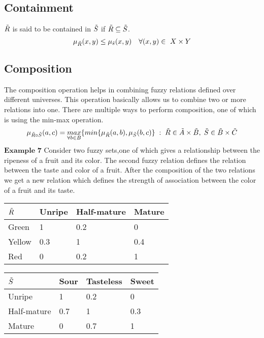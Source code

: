 \documentclass{article}
\begin{document}
\subsection{Containment}
$\Tilde{R}$ is said to be contained in $\Tilde{S}$ if $\Tilde{R} \subseteq\Tilde{S}$.
\[\mu_{\Tilde{R}}(x,y)\leq\mu_{\Tilde{s}}(x,y)\quad\forall (x,y)\in\ X\times Y\]
\subsection{Composition}
The composition operation helps in combining fuzzy relations defined over different universes. This operation basically allows us to combine two or more relations into one. There are multiple ways to perform composition, one of which is using the min-max operation.\newline
\begin{equation}
    \mu_{\Tilde{R}\circ\Tilde{S}}(a,c)=\mathop{max}_{\forall b\in B}\{{min\{\mu_{\Tilde{R}}(a,b),\mu_{\Tilde{S}}(b,c)\}}\hspace{0.1cm} :\hspace{0.1cm} \Tilde{R} \in \Tilde{A}\times\Tilde{B},\hspace{0.1cm}\Tilde{S} \in \Tilde{B}\times\Tilde{C} 
\end{equation}
$\textbf{Example 7}$\newline\newline
Consider two fuzzy sets,one of which gives a relationship between the ripeness of a fruit and its color. The second fuzzy relation defines the relation between the taste and color of a fruit. After the composition of the two relations we get a new relation which defines the strength of association between the color of a fruit and its taste. \newline\newline
\begin{center}
\def\arraystretch{1.4}%
\begin{tabular}{ | m{1cm} | m{1cm}| m{1cm} | m{1cm}| } 
  \hline
  $\Tilde{R}$ & Unripe & Half-mature & Mature \\ 
  \hline
  Green & 1 & 0.2 & 0 \\ 
  \hline
  Yellow & 0.3 & 1 & 0.4\\ 
  \hline
  Red & 0 & 0.2 & 1 \\ 
  \hline
\end{tabular}
\quad
    \def\arraystretch{1.4}%
\begin{tabular}{ | m{1cm} | m{1cm}| m{1.4cm} | m{1cm}| } 
  \hline
  $\Tilde{S}$ & Sour & Tasteless & Sweet \\ 
  \hline
  Unripe & 1 & 0.2 & 0 \\ 
  \hline
  Half-mature & 0.7 & 1 & 0.3\\ 
  \hline
  Mature & 0 & 0.7 & 1 \\ 
  \hline
\end{tabular}
\end{center}
\end{document}
